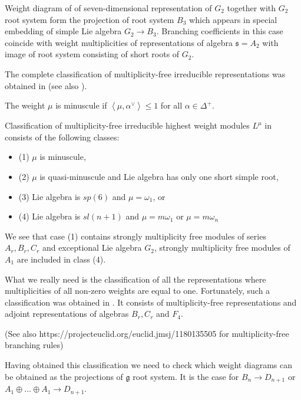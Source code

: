 \documentclass{article}
\newcommand{\gf}{\mathfrak{g}}
\newcommand{\sfr}{\mathfrak{s}}
\begin{document}
Weight diagram of of seven-dimensional representation of $G_{2}$ together with $G_{2}$ root system
form the projection of root system $B_{3}$ which appears in special embedding of simple Lie algebra
$G_{2}\to B_{3}$. Branching coefficients in this case coincide with weight multiplicities of
representations of algebra $\sfr=A_{2}$ with image of root system consisting of short roots of
$G_{2}$. 

The complete classification of multiplicity-free irreducible representations was obtained in
\cite{howe1995perspectives} (see also \cite{stembridge2003multiplicity}).


The weight $\mu$ is minuscule if $\left<\mu,\alpha^{\vee}\right>\leq 1$ for all $\alpha\in
\Delta^{+}$. 

Classification of multiplicity-free irreducible highest weight modules $L^{\mu}$ in
\cite{howe1995perspectives,stembridge2003multiplicity} consists of the following classes:
\begin{itemize}
\item (1) $\mu$ is minuscule,
\item (2) $\mu$ is quasi-minuscule and Lie algebra has only one short simple root,
\item (3) Lie algebra is $sp(6)$ and $\mu=\omega_{1}$, or
\item (4) Lie algebra is $sl(n + 1)$ and  $\mu= m\omega_{1}$ or $\mu  = m\omega_{n}$ 
\end{itemize}

We see that case (1) contains strongly multiplicity free modules of series $A_{r}, B_{r}, C_{r}$ and
exceptional Lie algebra $G_{2}$, strongly multiplicity free modules of $A_{1}$ are included in class
(4). 




What we really need is the classification of all the representations where multiplicities of all
non-zero weights are equal to one. Fortunately, such a classification was obtained in
\cite{plotkin1998visual}. It consists of multiplicity-free representations and adjoint
representations of algebras $B_{r}, C_{r}$ and $F_{4}$. 



(See also https://projecteuclid.org/euclid.jmsj/1180135505 for multiplicity-free branching rules)

Having obtained this classification we need to check which weight diagrams can be obtained as the
projections of $\gf$ root system. It is the case for $B_{n}\to D_{n+1}$ or $A_{1}\oplus\dots\oplus
A_{1}\to D_{n+1}$.
\end{document}
